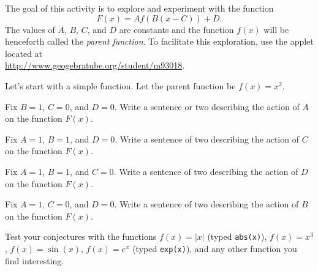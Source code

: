 \begin{pa} \label{PA:0.3}
The goal of this activity is to explore and experiment with the function
\[ F(x) = Af(B(x-C))+D. \]
The values of $A$, $B$, $C$, and $D$ are constants and the function $f(x)$ will be
henceforth called the {\it parent function}.  To facilitate this exploration, use the
applet located at \\
\href{http://www.geogebratube.org/student/m93018}{http://www.geogebratube.org/student/m93018}.
\ba
    \item Let's start with a simple function.  Let the parent function be $f(x) = x^2$.
        \bei
            \item Fix $B=1$, $C=0$, and $D=0$.  Write a sentence or two describing the
                action of $A$ on the function $F(x)$.
            \item Fix $A=1$, $B=1$, and $D=0$.  Write a sentence of two describing the
                action of $C$ on the function $F(x)$.
            \item Fix $A=1$, $B=1$, and $C=0$.  Write a sentence of two describing the
                action of $D$ on the function $F(x)$.
            \item Fix $A=1$, $C=0$, and $D=0$.  Write a sentence of two describing the
                action of $B$ on the function $F(x)$.
        \eei
    \item Test your conjectures with the functions $f(x) = |x|$ (typed \texttt{abs(x)}),
        $f(x) = x^3$, $f(x) = \sin(x)$, $f(x) = e^x$ (typed \texttt{exp(x)}), and any
        other function you find interesting. 
\ea
\end{pa} \afterpa

